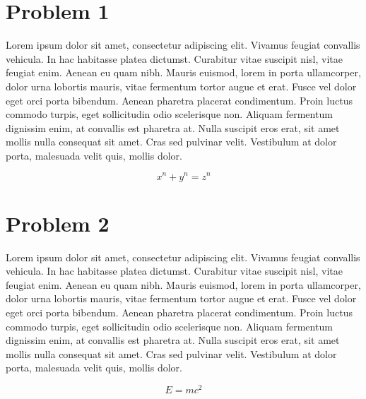 \documentclass{article}
\date{Saturday, January 25 2020}
\begin{document}
\makecover

\section*{Problem 1}
Lorem ipsum dolor sit amet, consectetur adipiscing elit. Vivamus feugiat convallis vehicula. In hac habitasse platea dictumst. Curabitur vitae suscipit nisl, vitae feugiat enim. Aenean eu quam nibh. Mauris euismod, lorem in porta ullamcorper, dolor urna lobortis mauris, vitae fermentum tortor augue et erat. Fusce vel dolor eget orci porta bibendum. Aenean pharetra placerat condimentum. Proin luctus commodo turpis, eget sollicitudin odio scelerisque non. Aliquam fermentum dignissim enim, at convallis est pharetra at. Nulla suscipit eros erat, sit amet mollis nulla consequat sit amet. Cras sed pulvinar velit. Vestibulum at dolor porta, malesuada velit quis, mollis dolor.

\[ x^n + y^n = z^n \]

\section*{Problem 2}
Lorem ipsum dolor sit amet, consectetur adipiscing elit. Vivamus feugiat convallis vehicula. In hac habitasse platea dictumst. Curabitur vitae suscipit nisl, vitae feugiat enim. Aenean eu quam nibh. Mauris euismod, lorem in porta ullamcorper, dolor urna lobortis mauris, vitae fermentum tortor augue et erat. Fusce vel dolor eget orci porta bibendum. Aenean pharetra placerat condimentum. Proin luctus commodo turpis, eget sollicitudin odio scelerisque non. Aliquam fermentum dignissim enim, at convallis est pharetra at. Nulla suscipit eros erat, sit amet mollis nulla consequat sit amet. Cras sed pulvinar velit. Vestibulum at dolor porta, malesuada velit quis, mollis dolor.

\[E=mc^2\]
\end{document}
